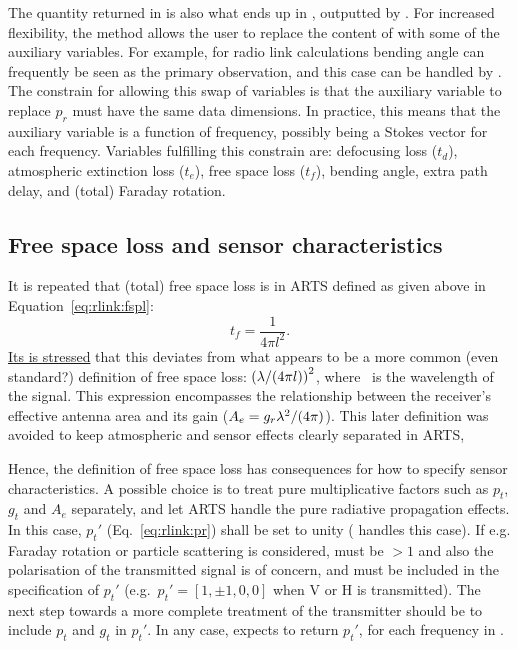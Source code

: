 The quantity returned in  is also what ends up in
, outputted by . For increased flexibility, the
method  allows the user to replace the content
of  with some of the auxiliary variables. For example, for radio
link calculations bending angle can frequently be seen as the primary
observation, and this case can be handled by .
The constrain for allowing this swap of variables is that the auxiliary
variable to replace $p_r$ must have the same data dimensions. In practice, this
means that the auxiliary variable is a function of frequency, possibly being a
Stokes vector for each frequency. Variables fulfilling this constrain are:
defocusing loss ($t_d$), atmospheric extinction loss ($t_e$), free space loss
($t_f$), bending angle, extra path delay, and (total) Faraday rotation.


\subsection{Free space loss and sensor characteristics}
\label{sec:rlinks:free}

It is repeated that (total) free space loss is in ARTS defined as given
above in Equation~\ref{eq:rlink:fspl}:
\begin{displaymath}
  t_f = \frac{1}{4\pi l^2}.
\end{displaymath}
\underline{Its is stressed} that this deviates from what
appears to be a more common (even standard?) definition of free space loss:
$\left(\lambda/(4 \pi l)\right)^2$, where \Wvl\ is the wavelength of the
signal. This expression encompasses the relationship between the receiver's
effective antenna area and its gain ($A_e=g_r\lambda^2/(4\pi)$). This later
definition was avoided to keep atmospheric and sensor effects clearly separated
in ARTS,

Hence, the definition of free space loss has consequences for how to specify
sensor characteristics. A possible choice is to treat pure multiplicative
factors such as $p_t$, $g_t$ and $A_e$ separately, and let ARTS handle the pure
radiative propagation effects. In this case, $p_t'$ (Eq.~\ref{eq:rlink:pr})
shall be set to unity ( handles this case). If
e.g. Faraday rotation or particle scattering is considered,
 must be $>1$ and also the polarisation of the
transmitted signal is of concern, and must be included in the specification of
$p_t'$ (e.g.\ $p_t'=[1,\pm1,0,0]$ when V or H is transmitted). The next step
towards a more complete treatment of the transmitter should be to include $p_t$
and $g_t$ in $p_t'$. In any case,  expects
 to return $p_t'$, for each frequency in
.

